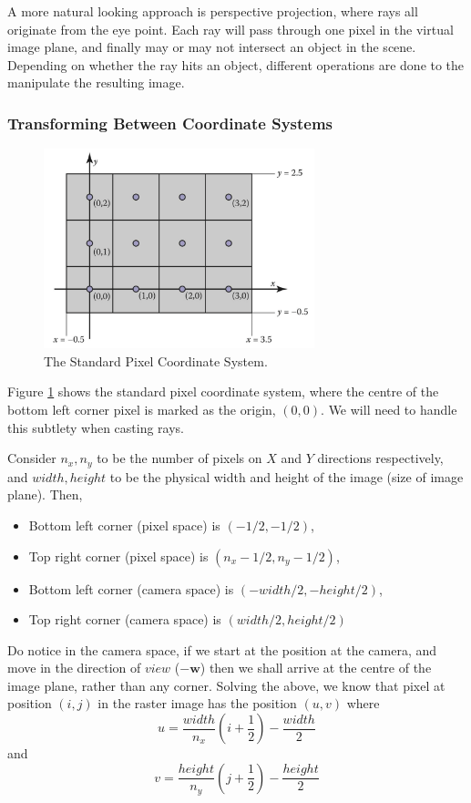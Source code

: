 \documentclass[11pt]{article}
\newcommand{\bw}{\mathbf{w}}
\begin{document}
A more natural looking approach is perspective projection, where rays all originate from the eye point. Each ray will pass through one pixel in the virtual image plane, and finally may or may not intersect an object in the scene. Depending on whether the ray hits an object, different operations are done to the manipulate the resulting image. 

\subsubsection{Transforming Between Coordinate Systems}
\begin{figure}
	\center\includegraphics[width=0.7\textwidth]{figs/standard pixel coordinate systems}
	\caption{\label{fig:standard pixel coordinate system} The Standard Pixel Coordinate System. }
\end{figure}
Figure \ref{fig:standard pixel coordinate system} shows the standard pixel coordinate system, where the centre of the bottom left corner pixel is marked as the origin, $(0, 0)$. We will need to handle this subtlety when casting rays. 

Consider $n_x, n_y$ to be the number of pixels on $X$ and $Y$ directions respectively, and $width, height$ to be the physical width and height of the image (size of image plane). Then, 
\begin{itemize}
	\item Bottom left corner (pixel space) is $(-1/2, -1/2)$,
	\item Top right corner (pixel space) is $(n_x - 1/2, n_y - 1/2)$, 
	\item Bottom left corner (camera space) is $(-width / 2, -height / 2)$, 
	\item Top right corner (camera space) is $(width / 2, height / 2)$
\end{itemize}
Do notice in the camera space, if we start at the position at the camera, and move in the direction of $view$ ($-\bw$) then we shall arrive at the centre of the image plane, rather than any corner. Solving the above, we know that pixel at position $(i, j)$ in the raster image has the position $(u, v)$ where
\begin{equation}
	u = \frac{width}{n_x} \left( i + \frac{1}{2} \right) - \frac{width}{2} \label{eq:u transform}
\end{equation}
and 
\begin{equation}
	v = \frac{height}{n_y} \left( j + \frac{1}{2} \right) - \frac{height}{2} \label{eq:v transform}
\end{equation}
\end{document}
